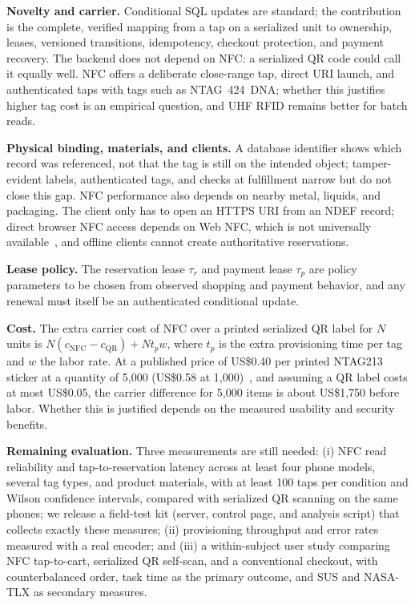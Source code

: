 \documentclass[conference]{IEEEtran}
\begin{document}
\textbf{Novelty and carrier.}
Conditional SQL updates are standard; the contribution is the
complete, verified mapping from a tap on a serialized unit to
ownership, leases, versioned transitions, idempotency, checkout
protection, and payment recovery. The backend does not depend on NFC:
a serialized QR code could call it equally well. NFC offers a
deliberate close-range tap, direct URI launch, and authenticated taps
with tags such as NTAG~424~DNA; whether this justifies higher tag cost
is an empirical question, and UHF RFID remains better for batch reads.

\textbf{Physical binding, materials, and clients.}
A database identifier shows which record was referenced, not that the
tag is still on the intended object; tamper-evident labels,
authenticated tags, and checks at fulfillment narrow but do not close
this gap. NFC performance also depends on nearby metal, liquids, and
packaging. The client only has to open an HTTPS URI from an NDEF
record; direct browser NFC access depends on Web NFC, which is not
universally available~\cite{refWebNFC}, and offline clients cannot
create authoritative reservations.

\textbf{Lease policy.}
The reservation lease $\tau_r$ and payment lease $\tau_p$ are policy
parameters to be chosen from observed shopping and payment behavior,
and any renewal must itself be an authenticated conditional update.

\textbf{Cost.}
The extra carrier cost of NFC over a printed serialized QR label for
$N$ units is $N(c_{\mathrm{NFC}}-c_{\mathrm{QR}})+N t_p w$, where $t_p$
is the extra provisioning time per tag and $w$ the labor rate. At a
published price of US\$0.40 per printed NTAG213 sticker at a quantity
of 5{,}000 (US\$0.58 at 1{,}000)~\cite{refGoToTags}, and assuming a
QR label costs at most US\$0.05, the carrier difference for 5{,}000
items is about US\$1{,}750 before labor. Whether this is justified
depends on the measured usability and security benefits.

\textbf{Remaining evaluation.}
Three measurements are still needed: (i) NFC read reliability and
tap-to-reservation latency across at least four phone models,
several tag types, and product materials, with at least 100 taps per
condition and Wilson confidence intervals, compared with serialized
QR scanning on the same phones; we release a field-test kit (server,
control page, and analysis script) that collects exactly these
measures; (ii) provisioning throughput and
error rates measured with a real encoder; and (iii) a within-subject
user study comparing NFC tap-to-cart, serialized QR self-scan, and a
conventional checkout, with counterbalanced order, task time as the
primary outcome, and SUS and NASA-TLX
as secondary measures.
\end{document}
